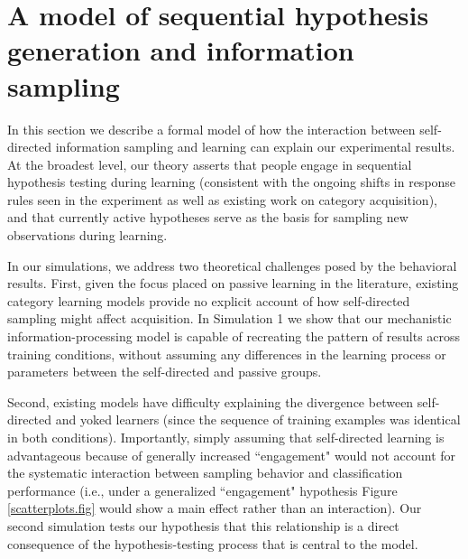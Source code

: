 \documentclass[3p,twocolumn,authoryear,10pt]{elsarticle}
\begin{document}
\section{A model of sequential hypothesis generation and information sampling}

In this section we describe a formal model of how the interaction between self-directed information sampling and learning can explain our experimental results.  At the broadest level, our theory asserts that people engage in sequential hypothesis testing during learning (consistent with the ongoing shifts in response rules seen in the experiment as well as existing work on category acquisition), and that currently active hypotheses serve as the basis for sampling new observations during learning. 

In our simulations, we address two theoretical challenges posed by the behavioral results. First, given the focus placed on passive learning in the literature, existing category learning models provide no explicit account of how self-directed sampling might affect acquisition. In Simulation 1 we show that our mechanistic information-processing model is capable of recreating the pattern of results across training conditions, without assuming any differences in the learning process or parameters between the self-directed and passive groups. 

Second, existing models have difficulty explaining the divergence between self-directed and yoked learners (since the sequence of training examples was identical in both conditions). 
Importantly, simply assuming that self-directed learning is advantageous because of generally increased ``engagement" would not account for the systematic interaction between sampling behavior and classification performance (i.e., under a generalized ``engagement" hypothesis Figure \ref{scatterplots.fig} would show a main effect rather than an interaction). Our second simulation tests our hypothesis that this relationship is a direct consequence of the hypothesis-testing process that is central to the model.



\end{document}
